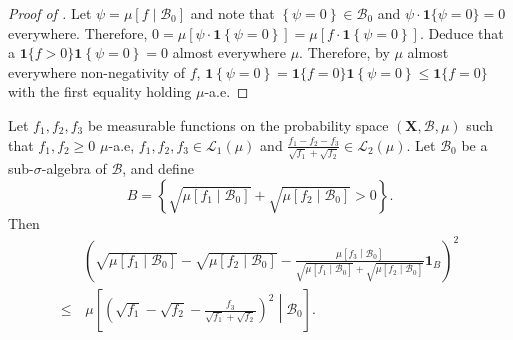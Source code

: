 \begin{proof}[Proof of ]
Let \(\psi = \mu \left[ f \middle| \mathcal{B}_{0}
\right]\) and note that \(\left\{ \psi = 0 \right\} \in \mathcal{B}_{0}\) and
\(\psi \cdot \mathbf{1} \{\psi = 0\} = 0\) everywhere.
Therefore,
\(0 = \mu \left[ \psi \cdot \mathbf{1} \left\{ \psi = 0 \right\} \right] = \mu
\left[ f \cdot \mathbf{1} \left\{ \psi = 0 \right\} \right]\).
Deduce that a \(\mathbf{1} \{f > 0\} \mathbf{1} \left\{ \psi = 0 \right\} = 0\)
almost everywhere \(\mu\).
Therefore, by \(\mu\) almost everywhere non-negativity of \(f\),
\(\mathbf{1} \left\{ \psi = 0 \right\} = \mathbf{1} \{f = 0\} \mathbf{1} \left\{
\psi = 0 \right\} \leq \mathbf{1} \{f = 0\}\) with the first equality holding
\(\mu\)-a.e.
\end{proof}

\begin{lemma}
\label{lem--sqrt-integral-inequality}
Let \(f_{1}, f_{2}, f_{3}\) be measurable functions on the probability space
\((\mathbf{X}, \mathcal{B}, \mu)\) such that \(f_{1}, f_{2} \geq 0\)
\(\mu\)-a.e, \(f_{1}, f_{2}, f_{3} \in \mathscr{L}_{1} (\mu)\) and
\(\frac{f_{1} - f_{2} - f_{3}}{\sqrt{f_{1}} + \sqrt{f_{2}}} \in \mathscr{L}_{2}
(\mu)\).
Let \(\mathcal{B}_{0}\) be a sub-\(\sigma\)-algebra of \(\mathcal{B}\), and
define
\begin{equation*}
  B = \left\{ \sqrt{\mu \left[ f_{1} \middle| \mathcal{B}_{0} \right]} +
  \sqrt{\mu \left[ f_{2} \middle| \mathcal{B}_{0} \right]} > 0 \right\}.
\end{equation*}
Then
\begin{equation*}
  \begin{split}
    & \left( \sqrt{\mu \left[ f_{1} \middle| \mathcal{B}_{0} \right]} -
    \sqrt{\mu \left[ f_{2} \middle| \mathcal{B}_{0} \right]} -
    \frac{\mu \left[ f_{3} \middle| \mathcal{B}_{0} \right]}{\sqrt{\mu \left[
    f_{1} \middle| \mathcal{B}_{0} \right]} + \sqrt{\mu \left[ f_{2} \middle|
    \mathcal{B}_{0} \right]}} \mathbf{1}_{B} \right)^{2} \\
    \leq
    & \, \mu \left[ \left( \sqrt{f_{1}} - \sqrt{f_{2}} -
    \frac{f_{3}}{\sqrt{f_{1}} + \sqrt{f_{2}}} \right)^{2} \middle|
    \mathcal{B}_{0} \right].
  \end{split}
\end{equation*}
\end{lemma}

